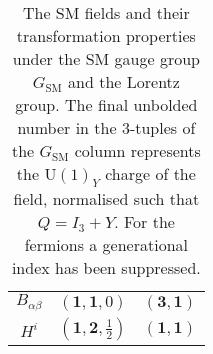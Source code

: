 \begin{table}[t]
\begin{tabular}{ccc}
    $B_{\alpha \beta}$           & $(\mathbf{1}, \mathbf{1}, 0)$                                             & $(\mathbf{3}, \mathbf{1})$                      \\
    $H^{i}$                      & $(\mathbf{1}, \mathbf{2}, \tfrac{1}{2})$                                  & $(\mathbf{1}, \mathbf{1})$                      \\
    \bottomrule
  \end{tabular}
  \egroup
  \caption[The SM fields and their transformation properties under the SM gauge
  group $G_{\text{SM}}$ and the Lorentz group.]{The SM fields and their
    transformation properties under the SM gauge group $G_{\text{SM}}$ and the
    Lorentz group. The final unbolded number in the 3-tuples of the
    $G_{\text{SM}}$ column represents the $\mathrm{U}(1)_Y$ charge of the field,
    normalised such that $Q = I_{3} + Y$. For the fermions a generational index
    has been suppressed.}
  \label{tbl:sm}
\end{table}

